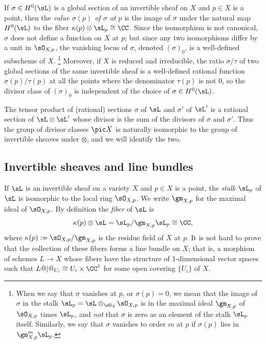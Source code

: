 If $\sigma\in H^0(\sL)$ is a global section of an invertible sheaf on
%
$X$ and $p\in X$ is a point, then the 
\emph{value $\sigma(p)$ of $\sigma$ at $p$}
is the image  of $\sigma$ under the natural map
$H^0(\sL)$ to the fiber $\kappa(p) \otimes \sL_{p} \cong \CC$. 
Since the isomorphism is not canonical, $\sigma$ does not define a function on $X$ at $p$; but since any two isomorphisms
differ by a unit in $\sO_{X,p}$, the vanishing locus of $\sigma$,
denoted $(\sigma)_0$, is a well-defined subscheme of $X$.%
%
\footnote{
When we  say that 
\def\marginpar{\marginparhere[200pt]}%
$\sigma$ vanishes at $p$,
or $\sigma(p) = 0$, we mean that the 
image of $\sigma$ in the stalk $\sL_p = \sL \otimes_{\sO_{X}}\!\sO_{X,p}$ is in
the maximal ideal $\gm_{X,p}$ of $\sO_{X,p}$ times $\sL_p$,
and \emph{not} that $\sigma$ is zero
as an element of the stalk $\sL_p$ itself. Similarly, we say that $\sigma$ vanishes to order $m$ at $p$ if $\sigma(p)$ lies in $\gm_{X,p}^m\sL_p$. }
%
 Moreover, if $X$ is reduced and irreducible, 
the ratio $\sigma/\tau$ of two global sections
 of the same invertible sheaf is a well-defined rational function
$\sigma(p)/\tau(p)$ at all the points where the denominator $\tau(p)$ is not 0, so the divisor class of 
$(\sigma)_0$ is independent of the choice of $\sigma \in H^0(\sL)$.

The tensor product of (rational) sections $\sigma$ of $\sL$ and $\sigma'$
of $\sL'$ is a rational section of $\sL \otimes \sL'$ 
whose divisor is
the sum of the divisors of $\sigma$ and 
$\sigma'$. Thus the group of divisor classes $\pic X$ is naturally isomorphic to the group of invertible
sheaves under $\otimes$, and we will identify the two.

\subsection*{Invertible sheaves and line bundles}

If $\sL$ is an invertible sheaf on a variety $X$ and $p\in X$ is a point, the 
%
%
%
\emph{stalk} $\sL_p$
of $\sL$ is isomorphic to the local
ring $\sO_{X,p}$. We write 
$\gm_{X,p}$
for the maximal ideal of $\sO_{X,p}$. By definition the 
\emph{fiber} 
%
of $\sL$ is 
$$
\kappa(p) \otimes \sL =\sL_p/\gm_{X,p}\sL_p\cong \CC
,
$$
where 
%
$\kappa(p) := \sO_{X,p}/\gm_{X,p}$
is the residue field of $X$ at $p$.
It is not hard to prove that the collection of these fibers forms a line bundle on $X$; that is,
%
a morphism of schemes $L \to X$ whose fibers have the structure of 1-dimensional vector spaces
such that $L@|@_{U_{i}} \cong U_{i}\times \CC^{1}$ for some open covering $\{U_{i}\}$ of $X$.

